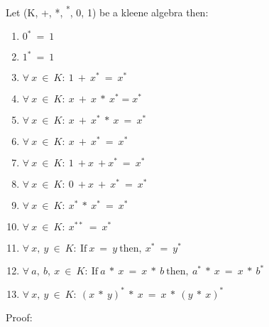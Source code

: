Let (K, +, *, \textsuperscript{*}, 0, 1) be a kleene algebra then:
\begin{enumerate}
\item $0^{*}\ =\ 1$
\item $1^{*}\ =\ 1$
\item $\forall \ x\ \in\ K:\ 1\ +\ x^{*}\ =\ x^{*}$
\item $\forall \ x\ \in\ K:\ x\ +\ x\ *\ x^{*} = x^{*}$
\item $\forall \ x\ \in\ K:\ x\ +\ x^{*}\ *\ x\ =\ x^{*}$
\item $\forall \ x\ \in\ K:\ x\ +\ x^{*}\ =\ x^{*}$
\item $\forall \ x\ \in\ K:\ 1\ + x\ + x^{*}\ =\ x^{*}$
\item $\forall \ x\ \in\ K:\ 0\ + x\ +\ x^{*}\ =\ x^{*}$
\item $\forall \ x\ \in\ K:\ x^{*}\ *\ x^{*}\ =\ x^{*}$
\item $\forall \ x\ \in\ K:\ x^{**}\ =\ x^{*}$
\item $\forall\ x,\ y\ \in\ K:\ \text{If}\ x\ =\ y\ \text{then},\ x^{*}\ =\ y^{*}$
\item $\forall\ a,\ b,\ x\ \in\ K:\ \text{If}\ a\ *\ x\ =\ x\ *\ b\ \text{then},\ a^{*}\ *\ x\ =\ x\ *\ b^{*}$
\item $\forall\ x,\ y\ \in\ K:\ (x\ *\ y)^{*}\ *\ x\ =\ x\ *\ (y\ *\ x)^{*}$
\end{enumerate}
Proof:
